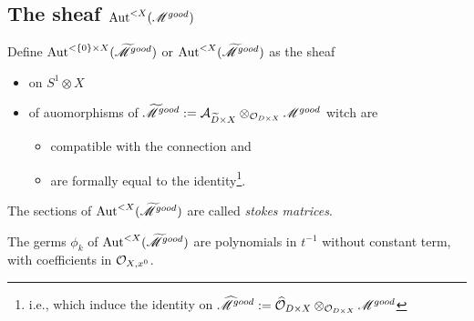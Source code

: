 \subsection{The sheaf $\operatorname{Aut}^{<X}(\mathscr{M}^{good})$}
\begin{defn}
  Define $\operatorname{Aut}^{<\{0\}\times X}(\widetilde{\mathscr{M}}^{good})$ or
  $\operatorname{Aut}^{<X}(\widetilde{\mathscr{M}}^{good})$ as the sheaf
  \begin{itemize}
    \item on $S^1\otimes X$
    \item of auomorphisms of $\widetilde{\mathscr{M}}^{good}:=\mathcal{A}_{\widetilde D\times
      X}\otimes_{\mathcal{O}_{D\times X}}\mathscr{M}^{good}$
      witch are
      \begin{itemize}
        \item compatible with the connection and
        \item are formally equal to the identity\footnote{i.e., which
          induce the identity on $\widehat {\mathscr{M}}^{good}:=\widehat {\mathcal{O}}_{D\times
          X}\otimes_{\mathcal{O}_{D\times X}}\mathscr{M}^{good}$}.
      \end{itemize}
  \end{itemize}
  The sections of $\operatorname{Aut}^{<X}(\widetilde{\mathscr{M}}^{good})$ are called \emph{stokes
  matrices}.
\end{defn}
The germs $\phi_k$ of $\operatorname{Aut}^{<X}(\widetilde{\mathscr{M}}^{good})$ are polynomials in $t^{-1}$
without constant term, with coefficients in $\mathcal{O}_{X,x^0}$.

